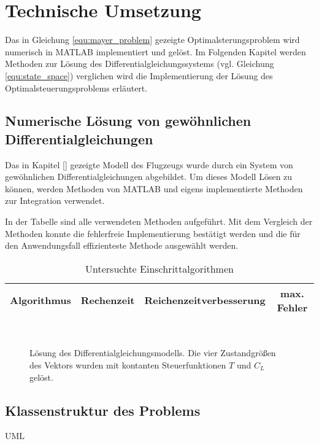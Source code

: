 \chapter{Technische Umsetzung}
Das in Gleichung \eqref{equ:mayer_problem} gezeigte Optimalsterungsproblem wird numerisch in MATLAB implementiert und gelöst. Im Folgenden Kapitel werden 
Methoden zur Lösung des Differentialgleichungssystems (vgl. Gleichung \eqref{equ:state_space}) verglichen wird die Implementierung der Lösung des 
Optimalsteuerungsproblems erläutert.

\section{Numerische Lösung von gewöhnlichen Differentialgleichungen}
Das in Kapitel \autoref{} gezeigte Modell des Flugzeugs wurde durch ein System von gewöhnlichen Differentialgleichungen abgebildet. Um dieses Modell
Lösen zu können, werden Methoden von MATLAB und eigens implementierte Methoden zur Integration verwendet.

In der Tabelle sind alle verwendeten Methoden aufgeführt.
Mit dem Vergleich der Methoden konnte die fehlerfreie Implementierung bestätigt werden und die für den Anwendungsfall effizienteste Methode 
ausgewählt werden.

\begin{table}[htbp]
    \caption{Untersuchte Einschrittalgorithmen}
    \begin{tabularx}{\textwidth}{Xccc}
        \toprule
        Algorithmus & Rechenzeit & Reichenzeitverbesserung & max. Fehler \\
        \midrule
        
        \bottomrule
    \end{tabularx}
\end{table}

\begin{figure}[!htbp]
    \centering 
    \qquad
     \\

    \qquad
    \caption{Lösung des Differentialgleichungsmodells. Die vier Zustandgrößen des Vektors wurden mit kontanten Steuerfunktionen \(T\) und \(C_L\) gelöst.} %
\end{figure}

\section{Klassenstruktur des Problems}

UML

